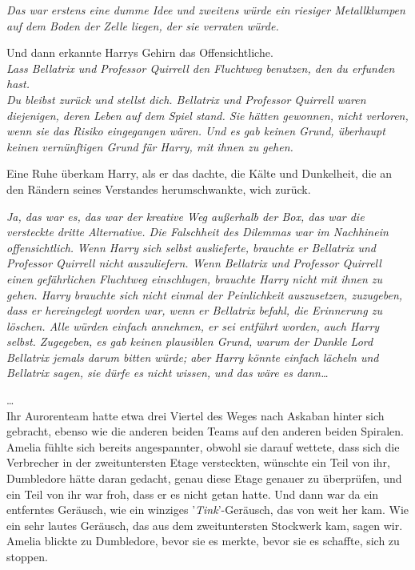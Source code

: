 {\emph{Das war erstens eine dumme Idee und zweitens würde ein riesiger Metallklumpen auf dem Boden der Zelle liegen, der sie verraten würde.}

Und dann erkannte Harrys Gehirn das Offensichtliche.\\ \emph{Lass Bellatrix und Professor Quirrell den Fluchtweg benutzen, den du erfunden hast.\\ Du bleibst zurück und stellst dich. Bellatrix und Professor Quirrell waren diejenigen, deren Leben auf dem Spiel stand. Sie hätten gewonnen, nicht verloren, wenn sie das Risiko eingegangen wären. Und es gab keinen Grund, überhaupt keinen vernünftigen Grund für Harry, mit ihnen zu gehen.}

Eine Ruhe überkam Harry, als er das dachte, die Kälte und Dunkelheit, die an den Rändern seines Verstandes herumschwankte, wich zurück.

\emph{Ja, das war es, das war der kreative Weg außerhalb der Box, das war die versteckte dritte Alternative. Die Falschheit des Dilemmas war im Nachhinein offensichtlich.} \emph{Wenn Harry sich selbst auslieferte, brauchte er Bellatrix und Professor Quirrell nicht auszuliefern. Wenn Bellatrix und Professor Quirrell einen gefährlichen Fluchtweg einschlugen, brauchte Harry nicht mit ihnen zu gehen. Harry brauchte sich nicht einmal der Peinlichkeit auszusetzen, zuzugeben, dass er hereingelegt worden war, wenn er Bellatrix befahl, die Erinnerung zu löschen. Alle würden einfach annehmen, er sei entführt worden, auch Harry selbst. Zugegeben, es gab keinen plausiblen Grund, warum der Dunkle Lord Bellatrix jemals darum bitten würde; aber Harry könnte einfach lächeln und Bellatrix sagen, sie dürfe es nicht wissen, und das wäre es dann…}

…\\ Ihr Aurorenteam hatte etwa drei Viertel des Weges nach Askaban hinter sich gebracht, ebenso wie die anderen beiden Teams auf den anderen beiden Spiralen. Amelia fühlte sich bereits angespannter, obwohl sie darauf wettete, dass sich die Verbrecher in der zweituntersten Etage versteckten, wünschte ein Teil von ihr, Dumbledore hätte daran gedacht, genau diese Etage genauer zu überprüfen, und ein Teil von ihr war froh, dass er es nicht getan hatte. Und dann war da ein entferntes Geräusch, wie ein winziges '\emph{Tink}'-Geräusch, das von weit her kam. Wie ein sehr lautes Geräusch, das aus dem zweituntersten Stockwerk kam, sagen wir. Amelia blickte zu Dumbledore, bevor sie es merkte, bevor sie es schaffte, sich zu stoppen.

}
